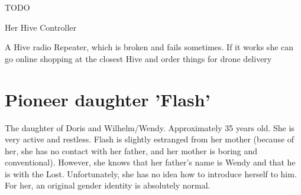 \begin{npcBox}[title=Doris]
    \begin{stressSection}
    \end{stressSection}
    \begin{tabularx}{\textwidth}{ XX }
    \end{tabularx}

    \begin{consequences}
    \item {}
    \item {}
    \item {}
    \end{consequences}

    \begin{npcDescription}
    TODO
    \end{npcDescription}


    \begin{equipment}
    \item Her Hive Controller
    \item A Hive radio Repeater, which is broken and fails sometimes. If it works she can go online shopping at the closest Hive and order things for drone delivery
    \end{equipment}
\end{npcBox}
\newpage

\section{Pioneer daughter 'Flash'}

The daughter of Doris and Wilhelm/Wendy. Approximately 35 years old. She is very active and restless. Flash is slightly estranged from her mother (because of her, she has no contact with her father, and her mother is boring and conventional). However, she knows that her father's name is Wendy and that he is with the Lost. Unfortunately, she has no idea how to introduce herself to him. For her, an original gender identity is absolutely normal.

